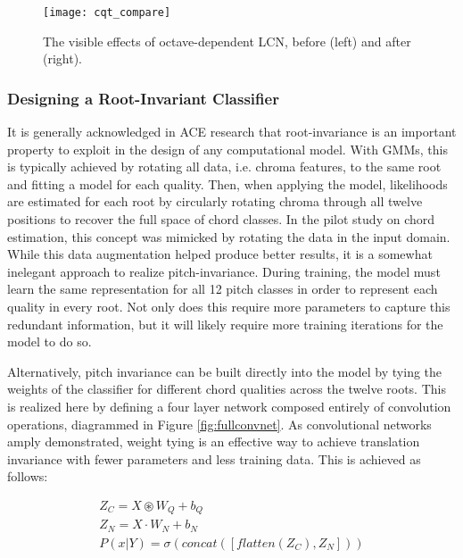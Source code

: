 \begin{figure}[!t]
\centering
\texttt{[image: cqt\_compare]}
\caption{The visible effects of octave-dependent LCN, before (left) and after (right).}
\label{fig:lcn_mods}
\end{figure}


\subsubsection{Designing a Root-Invariant Classifier}
\label{subsubsec:root_invariance}
It is generally acknowledged in ACE research that root-invariance is an important property to exploit in the design of any computational model.
With GMMs, this is typically achieved by rotating all data, i.e. chroma features, to the same root and fitting a model for each quality.
Then, when applying the model, likelihoods are estimated for each root by circularly rotating chroma through all twelve positions to recover the full space of chord classes.
In the pilot study on chord estimation, this concept was mimicked by rotating the data in the input domain.
While this data augmentation helped produce better results, it is a somewhat inelegant approach to realize pitch-invariance.
During training, the model must learn the same representation for all 12 pitch classes in order to represent each quality in every root.
Not only does this require more parameters to capture this redundant information, but it will likely require more training iterations for the model to do so.

Alternatively, pitch invariance can be built directly into the model by tying the weights of the classifier for different chord qualities across the twelve roots.
This is realized here by defining a four layer network composed entirely of convolution operations, diagrammed in Figure \ref{fig:fullconvnet}.
As convolutional networks amply demonstrated, weight tying is an effective way to achieve translation invariance with fewer parameters and less training data.
This is achieved as follows:

\begin{align*}
\label{eq:root_invariant}
Z_C = X \circledast W_Q + b_Q \\
Z_N = X \cdot W_N + b_N \\
P(x|Y) = \sigma(concat([flatten(Z_C), Z_N])) \\
\end{align*}

